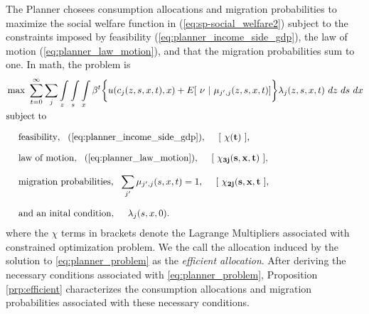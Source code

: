 \documentclass[12pt,pdftex]{article}
\begin{document}
\begin{onehalfspacing}
The Planner chosees consumption allocations and migration probabilities to maximize the social welfare function in (\ref{eq:sp-social_welfare2}) subject to the constraints imposed by feasibility (\ref{eq:planner_income_side_gdp}), the law of motion (\ref{eq:planner_law_motion}), and that the migration probabilities sum to one. In math, the problem is
\begin{align}
\small
& \max \ \sum_{t=0}^{\infty}\sum_{j} \int\limits_{z} \int\limits_{s} \int\limits_{x} \beta^{t} \bigg \{ u(c_{j}(z, s, x, t), x) + E[\ \nu \ | \ \mu_{j',j}(z, s,x,t)] \bigg \} \lambda_{j}(z, s, x, t) \ dz \ ds \ dx \label{eq:planner_problem} \\
& \mbox{subject to} \nonumber\\[.75em]
& \ \ \ \ \mbox{feasibility}, \ \ (\ref{eq:planner_income_side_gdp}), \ \ \ \ [\ \mathbf{\chi(t)} \ ], \nonumber \\[.75em]
& \ \ \ \ \mbox{law of motion}, \ \ (\ref{eq:planner_law_motion}), \ \ \ \ [\ \mathbf{\chi_{3j}(s, x, t)} \ ], \nonumber \\[.75em]
& \ \ \ \ \mbox{migration probabilities}, \ \ \sum_{j'} \mu_{j',j}(s,x,t) = 1,  \ \ \ \ [\ \mathbf{\chi_{2j}(s, x, t} \ ], \nonumber \\[.75em]
& \ \ \ \ \mbox{and an inital condition}, \ \ \ \ \lambda_j(s, x,0). \nonumber
\end{align}
where the $\chi$ terms in brackets denote the Lagrange Multipliers associated with constrained optimization problem. We the call the allocation induced by the solution to \ref{eq:planner_problem} as the \emph{efficient allocation}. After deriving the necessary conditions associated with \ref{eq:planner_problem}, Proposition \ref{prp:efficient} characterizes the consumption allocations and migration probabilities associated with these necessary conditions.


\end{onehalfspacing}
\end{document}
